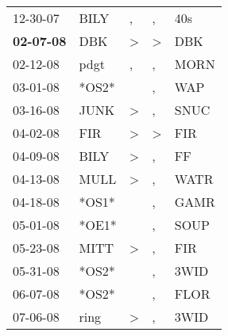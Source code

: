 \begin{supertabular}{p{0.07\textwidth}p{0.06\textwidth}p{0.02\textwidth}p{0.02\textwidth}p{0.06\textwidth}}
          12-30-07\textsuperscript{} &           BILY\textsuperscript{} &                , &                , &            40s\textsuperscript{} \\
 \textbf{02-07-08\textsuperscript{}} &            DBK\textsuperscript{} &     \textgreater &     \textgreater &            DBK\textsuperscript{} \\
          02-12-08\textsuperscript{} &           pdgt\textsuperscript{} &                , &                , &           MORN\textsuperscript{} \\
          03-01-08\textsuperscript{} &                            *OS2* &                  &                , &            WAP\textsuperscript{} \\
          03-16-08\textsuperscript{} &           JUNK\textsuperscript{} &     \textgreater &                , &           SNUC\textsuperscript{} \\
          04-02-08\textsuperscript{} &            FIR\textsuperscript{} &     \textgreater &     \textgreater &            FIR\textsuperscript{} \\
          04-09-08\textsuperscript{} &           BILY\textsuperscript{} &     \textgreater &                , &             FF\textsuperscript{} \\
          04-13-08\textsuperscript{} &           MULL\textsuperscript{} &     \textgreater &                , &           WATR\textsuperscript{} \\
          04-18-08\textsuperscript{} &                            *OS1* &                  &                , &           GAMR\textsuperscript{} \\
          05-01-08\textsuperscript{} &                            *OE1* &                  &                , &           SOUP\textsuperscript{} \\
          05-23-08\textsuperscript{} &           MITT\textsuperscript{} &     \textgreater &                , &            FIR\textsuperscript{} \\
          05-31-08\textsuperscript{} &                            *OS2* &                  &                , &           3WID\textsuperscript{} \\
          06-07-08\textsuperscript{} &                            *OS2* &                  &                , &           FLOR\textsuperscript{} \\
          07-06-08\textsuperscript{} &           ring\textsuperscript{} &     \textgreater &                , &           3WID\textsuperscript{} \\

\end{supertabular}
